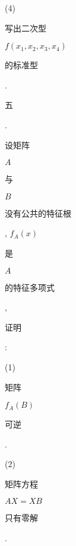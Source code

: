 \documentclass[10pt]{article}
\begin{document}
(4) \begin{CJK}{UTF8}{mj}写出二次型\end{CJK} $f\left(x_{1}, x_{2}, x_{3}, x_{4}\right)$ \begin{CJK}{UTF8}{mj}的标准型\end{CJK}.

\begin{CJK}{UTF8}{mj}五\end{CJK}. \begin{CJK}{UTF8}{mj}设矩阵\end{CJK} $A$ \begin{CJK}{UTF8}{mj}与\end{CJK} $B$ \begin{CJK}{UTF8}{mj}没有公共的特征根\end{CJK}, $f_{A}(x)$ \begin{CJK}{UTF8}{mj}是\end{CJK} $A$ \begin{CJK}{UTF8}{mj}的特征多项式\end{CJK}, \begin{CJK}{UTF8}{mj}证明\end{CJK}:

(1) \begin{CJK}{UTF8}{mj}矩阵\end{CJK} $f_{A}(B)$ \begin{CJK}{UTF8}{mj}可逆\end{CJK}.

(2) \begin{CJK}{UTF8}{mj}矩阵方程\end{CJK} $A X=X B$ \begin{CJK}{UTF8}{mj}只有零解\end{CJK}.
\end{document}

